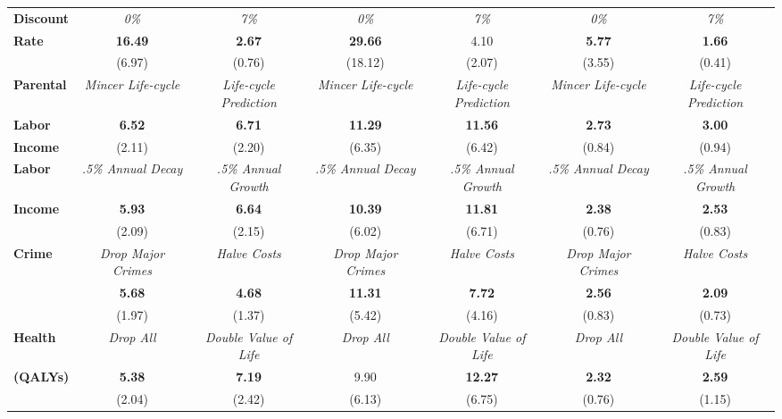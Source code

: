 \begin{tabular}{>{\bfseries}lcc|cc|cc}
Discount 	&	\textit{0\%}	&	\textit{7\%}	&	\textit{0\%}	&	\textit{7\%}	&	\textit{0\%}	&	\textit{7\%}	\\
Rate	&	\textbf{16.49}	&	\textbf{2.67}	&	\textbf{29.66}	&	4.10	&	\textbf{5.77}	&	\textbf{1.66}	\\
	&	(6.97)	&	(0.76)	&	(18.12)	&	(2.07)	&	(3.55)	&	(0.41)	\\ \midrule
Parental	&	\textit{Mincer Life-cycle}	&	\textit{Life-cycle Prediction}	&	\textit{Mincer Life-cycle}	&	\textit{Life-cycle Prediction}	&	\textit{Mincer Life-cycle}	&	\textit{Life-cycle Prediction}	\\
Labor	&	\textbf{6.52}	&	\textbf{6.71}	&	\textbf{11.29}	&	\textbf{11.56}	&	\textbf{2.73}	&	\textbf{3.00}	\\
Income	&	(2.11)	&	(2.20)	&	(6.35)	&	(6.42)	&	(0.84)	&	(0.94)	\\ \midrule
Labor	&	\textit{.5\% Annual Decay}	&	\textit{.5\% Annual Growth}	&	\textit{.5\% Annual Decay}	&	\textit{.5\% Annual Growth}	&	\textit{.5\% Annual Decay}	&	\textit{.5\% Annual Growth}	\\
Income	&	\textbf{5.93}	&	\textbf{6.64}	&	\textbf{10.39}	&	\textbf{11.81}	&	\textbf{2.38}	&	\textbf{2.53}	\\
	&	(2.09)	&	(2.15)	&	(6.02)	&	(6.71)	&	(0.76)	&	(0.83)	\\ \midrule
Crime	&	\textit{Drop Major Crimes}	&	\textit{Halve Costs}	&	\textit{Drop Major Crimes}	&	\textit{Halve Costs}	&	\textit{Drop Major Crimes}	&	\textit{Halve Costs}	\\
	&	\textbf{5.68}	&	\textbf{4.68}	&	\textbf{11.31}	&	\textbf{7.72}	&	\textbf{2.56}	&	\textbf{2.09}	\\
	&	(1.97)	&	(1.37)	&	(5.42)	&	(4.16)	&	(0.83)	&	(0.73)	\\ \midrule
Health	&	\textit{Drop All}	&	\textit{Double Value of Life}	&	\textit{Drop All}	&	\textit{Double Value of Life}	&	\textit{Drop All}	&	\textit{Double Value of Life}	\\
(QALYs)	&	\textbf{5.38}	&	\textbf{7.19}	&	9.90	&	\textbf{12.27}	&	\textbf{2.32}	&	\textbf{2.59}	\\
	&	(2.04)	&	(2.42)	&	(6.13)	&	(6.75)	&	(0.76)	&	(1.15)	\\ \bottomrule
\end{tabular} 